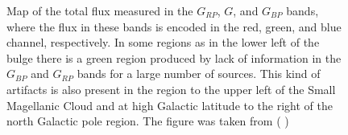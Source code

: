 \begin{figure}[!ht]
\centering
\caption{\scriptsize{  Map of the total flux measured in the $G_{RP}$, $G$, and $G_{BP}$ bands, where the flux in these bands is encoded in the red, green, and blue channel,
respectively. In some regions as in the lower left of the bulge there is a green region produced by lack of information in the $G_{BP}$ and $G_{RP}$ bands for a large number of sources. This kind of artifacts is also present in the region to the upper left of the Small Magellanic Cloud and at high Galactic
latitude to the right of the north Galactic pole region. The figure was taken from ( \citeyear{2018arXiv180409365G})}}
\label{fig:Gaia_DR2_FluxColor}
\end{figure}

